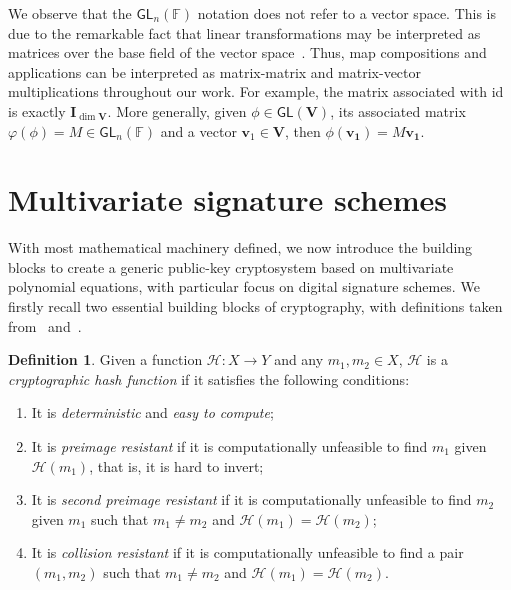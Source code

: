 \documentclass[draft, 12pt, a4paper, oneside]{memoir}
\theoremstyle{definition}
\newtheorem{definition}[theorem]{Definition}
\begin{document}
We observe that the $\mathsf{GL}_{n}(\mathbb{F})$ notation does not refer to a vector space. This is due to the remarkable fact that linear transformations may be interpreted as matrices over the base field of the vector space~\cite[Section 11.2]{Dummit:2003}. Thus, map compositions and applications can be interpreted as matrix-matrix and matrix-vector multiplications throughout our work. For example, the matrix associated with \textsf{id} is exactly $\mathbf{I}_{\dim \mathbf{V}}$. More generally, given $\phi \in \mathsf{GL}(\mathbf{V})$, its associated matrix $\varphi(\phi) = M \in \mathsf{GL}_{n}(\mathbb{F})$ and a vector $\mathbf{v}_{1} \in \mathbf{V}$, then $\phi(\mathbf{v_{1}}) = M\mathbf{v_{1}}$.


\section{Multivariate signature schemes}\label{sec:mult}

With most mathematical machinery defined, we now introduce the building blocks to create a generic public-key cryptosystem based on multivariate polynomial equations, with particular focus on digital signature schemes. We firstly recall two essential building blocks of cryptography, with definitions taken from~\cite[Section 7.1]{Gathen:2015} and~\cite[Section 6.1]{Goldreich:2004}.

\begin{definition}
  Given a function $\mathcal{H} : X \to Y$ and any $m_{1}, m_{2} \in X$, $\mathcal{H}$ is a \emph{cryptographic hash function} if it satisfies the following conditions:
  
  \begin{enumerate}
    \item It is \emph{deterministic} and \emph{easy to compute};
    \item It is \emph{preimage resistant} if it is computationally unfeasible to find $m_{1}$ given $\mathcal{H}(m_{1})$, that is, it is hard to invert;
    \item It is \emph{second preimage resistant} if it is computationally unfeasible to find $m_{2}$ given $m_{1}$ such that $m_{1} \neq m_{2}$ and $\mathcal{H}(m_{1}) = \mathcal{H}(m_{2})$;
    \item It is \emph{collision resistant} if it is computationally unfeasible to find a pair $(m_{1}, m_{2})$ such that $m_{1} \neq m_{2}$ and $\mathcal{H}(m_{1}) = \mathcal{H}(m_{2})$.
  \end{enumerate}
\end{definition}
\end{document}
